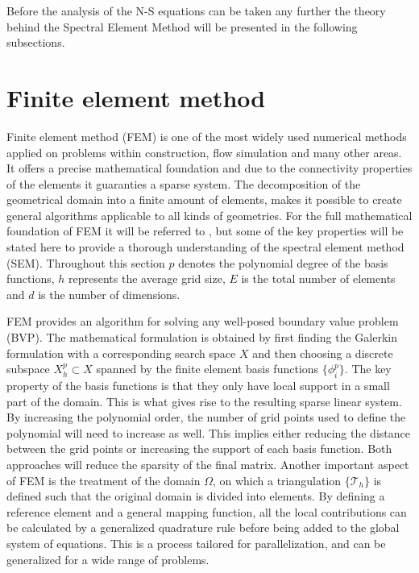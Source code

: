 Before the analysis of the N-S equations can be taken any further the theory behind the Spectral Element Method will be presented in the following
subsections.


\section{Finite element method}

Finite element method (FEM) is one of the most widely used numerical methods applied on problems within construction, flow simulation and many 
other areas. It offers a precise mathematical foundation and due to the connectivity properties of the elements 
it guaranties a sparse system. The decomposition of the geometrical domain into a finite amount of elements,
makes it possible to create general algorithms applicable to all kinds of geometries. 
For the full mathematical foundation of FEM it will be referred to \cite{Quarteroni}, but some of the key properties will be stated here
to provide a thorough understanding of the spectral element method (SEM). 
Throughout this section $p$ denotes the polynomial degree of the basis functions, $h$ represents the average grid size, $E$ is the total
number of elements and $d$ is the number of dimensions. 

FEM provides an algorithm for solving any well-posed boundary value problem (BVP).
The mathematical formulation is obtained by first finding the Galerkin
formulation with a corresponding search space $X$ and then choosing a discrete subspace $X^p_h\subset X$ 
spanned by the finite element basis functions $\{\phi^p_i\}$.
The key property of the basis functions is that they only have local support in a small part of the domain. 
This is what gives rise to the resulting sparse linear system. 
By increasing the polynomial order, the number of grid points used to define the polynomial will need to increase as well.
This implies either reducing the distance between the grid points or increasing the support of each basis function.
Both approaches will reduce the sparsity of the final matrix.
Another important aspect of FEM is the treatment of the domain $\Omega$, 
on which a triangulation $\{\mathcal{T}_h\}$ is defined such that the original domain is divided into elements.
By defining a reference element and a general mapping function, all the local contributions can be calculated by a 
generalized quadrature rule before being added to the global system of equations. This is a process tailored for parallelization, and can 
be generalized for a wide range of problems.

